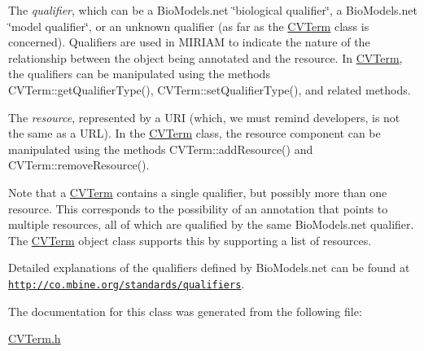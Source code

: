 \begin{DoxyItemize}
\item The {\itshape qualifier}, which can be a Bio\+Models.\+net \char`\"{}biological
  qualifier\char`\"{}, a Bio\+Models.\+net \char`\"{}model qualifier\char`\"{}, or an unknown qualifier (as far as the \hyperlink{class_c_v_term}{C\+V\+Term} class is concerned). Qualifiers are used in M\+I\+R\+I\+AM to indicate the nature of the relationship between the object being annotated and the resource. In \hyperlink{class_c_v_term}{C\+V\+Term}, the qualifiers can be manipulated using the methods C\+V\+Term\+::get\+Qualifier\+Type(), C\+V\+Term\+::set\+Qualifier\+Type(), and related methods.


\item The {\itshape resource}, represented by a U\+RI (which, we must remind developers, is not the same as a U\+RL). In the \hyperlink{class_c_v_term}{C\+V\+Term} class, the resource component can be manipulated using the methods C\+V\+Term\+::add\+Resource() and C\+V\+Term\+::remove\+Resource().


\end{DoxyItemize}

Note that a \hyperlink{class_c_v_term}{C\+V\+Term} contains a single qualifier, but possibly more than one resource. This corresponds to the possibility of an annotation that points to multiple resources, all of which are qualified by the same Bio\+Models.\+net qualifier. The \hyperlink{class_c_v_term}{C\+V\+Term} object class supports this by supporting a list of resources.

Detailed explanations of the qualifiers defined by Bio\+Models.\+net can be found at \href{http://co.mbine.org/standards/qualifiers}{\tt http\+://co.\+mbine.\+org/standards/qualifiers}. 

The documentation for this class was generated from the following file\+:\begin{DoxyCompactItemize}
\item 
\hyperlink{_c_v_term_8h}{C\+V\+Term.\+h}\end{DoxyCompactItemize}
